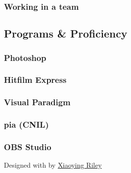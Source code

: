 \documentclass[]{article}
\begin{document}
\subsubsection{Working in a team}\label{working-in-a-team}

\subsection{\texorpdfstring{{ \emph{} \emph{} } Programs \&
Proficiency}{    Programs \& Proficiency}}\label{programs-proficiency}

\subsubsection{Photoshop}\label{photoshop}

\subsubsection{Hitfilm Express}\label{hitfilm-express}

\subsubsection{Visual Paradigm}\label{visual-paradigm}

\subsubsection{pia (CNIL)}\label{pia-cnil}

\subsubsection{OBS Studio}\label{obs-studio}

Designed with \emph{} by \href{http://themes.3rdwavemedia.com}{Xiaoying
Riley}
\end{document}
